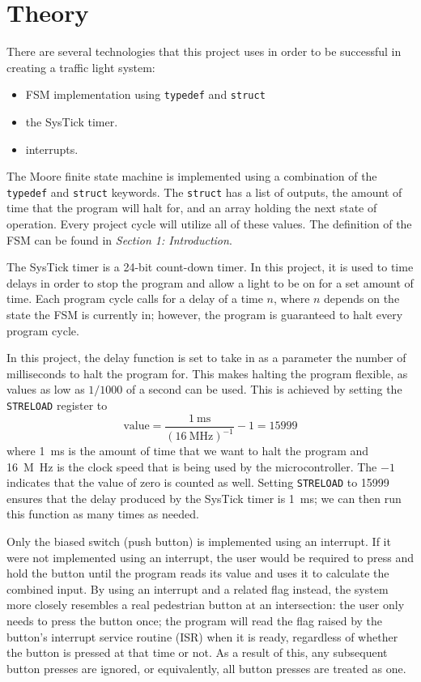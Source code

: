 \documentclass{article}
\renewcommand{\c}[1]{\texttt{#1}}
\begin{document}
\section{Theory} There are several technologies that this
project uses in order to be successful in creating a
traffic light system:
\begin{itemize}
    \item FSM implementation using \c{typedef} and \c{struct}
    \item the SysTick timer.
    \item interrupts.
\end{itemize}

The Moore finite state machine is implemented using a
combination of the \c{typedef} and \c{struct} keywords.
The \c{struct} has a list of outputs, the amount of time
that the program will halt for, and an array holding
the next state of operation. Every project cycle will utilize
all of these values. The definition of the FSM can be found
in \emph{Section 1: Introduction}.

The SysTick timer is a \num{24}-bit count-down timer. In this
project, it is used to time delays in order to stop the
program and allow a light to be on for a set amount of time.
Each program cycle calls for a delay of a time \(n\),
where \(n\) depends on the state the FSM is currently in;
however, the program is guaranteed to halt every
program cycle.

In this project, the delay function is set to take in
as a parameter the number of milliseconds to halt the program
for. This makes halting the program flexible, as values as
low as \(1/1000\) of a second can be used. This is achieved
by setting the \c{STRELOAD} register to
\begin{equation*}
    \text{value}= \frac{\SI{1}{\milli\second}}{(\SI{16}{\mega\hertz})^{-1}} - 1 = \num{15999}
\end{equation*} where \SI{1}{ms} is the amount of time that
we want to halt the program and \SI{16}{M\hertz} is the clock
speed that is being used by the microcontroller. The \(-1\)
indicates that the value of zero is counted as well. Setting
\c{STRELOAD} to \num{15999} ensures that the delay produced
by the SysTick timer is \SI{1}{ms}; we can then run this
function as many times as needed.

Only the biased switch (push button) is implemented using
an interrupt. If it were not implemented using an interrupt,
the user would be required to press and hold the button until
the program reads its value and uses it to calculate the
combined input. By using an interrupt and a related flag
instead, the system
more closely
resembles a real pedestrian button at an
intersection: the user only needs to press the button once;
the program will read the flag raised by the button's
interrupt service routine (ISR) when it is ready, regardless
of whether the button is pressed at that time or not. As a
result of this, any subsequent button presses are ignored, or
equivalently, all button presses are treated as one.
\end{document}
